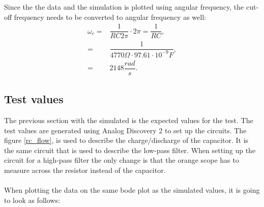 \noindent Since the the data and the simulation is plotted using angular frequency, the cut-off frequency needs to be converted to angular frequency as well:
\begin{align}
	\omega _c =& \dfrac{1}{RC2\pi} \cdot 2\pi = \dfrac{1}{RC}, \nonumber \\
			  =& \dfrac{1}{4770 \Omega \cdot 97.61 \cdot 10^{-9} F}, \nonumber \\
			  =& 2148 \dfrac{rad}{s}. \label{sim:cut}
\end{align}

\subsection{Test values}
The previous section with the simulated is the expected values for the test. The test values are generated using Analog Discovery 2 to set up the circuits. The figure \ref{rc_flow}, is used to describe the charge/discharge of the capacitor. It is the same circuit that is used to describe the low-pass filter. When setting up the circuit for a high-pass filter the only change is that the orange scope has to measure across the resistor instead of the capacitor. 
\\ \\ 
When plotting the data on the same bode plot as the simulated values, it is going to look as follows: \\
